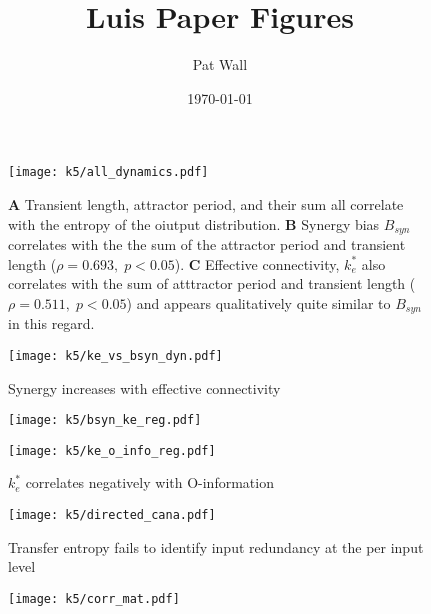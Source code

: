 \documentclass[12 pt]{article}
\title{Luis Paper Figures}
\author{Pat Wall}
\date{\today}
\begin{document}
\maketitle

\begin{figure}
    \texttt{[image: k5/all\_dynamics.pdf]}
    \caption{\textbf{A} Transient length, attractor period, and their sum all 
    correlate with the entropy of the oiutput distribution. \textbf{B} Synergy 
    bias $B_{syn}$ correlates with the the sum of the attractor period and 
    transient length ($\rho=0.693, \; p<0.05$). \textbf{C} Effective
    connectivity, $k_e^*$ also correlates with the sum of atttractor period and
    transient length ($\rho=0.511, \; p<0.05$) and appears qualitatively quite
    similar to $B_{syn}$ in this regard.}
    \label{fig:dynamics}
\end{figure}

\begin{figure}
    \texttt{[image: k5/ke\_vs\_bsyn\_dyn.pdf]}
    \caption{Synergy increases with effective connectivity}
    \label{fig:ke-bsyn}
\end{figure}

\begin{figure}
    \texttt{[image: k5/bsyn\_ke\_reg.pdf]}
\end{figure}

\begin{figure}
    \texttt{[image: k5/ke\_o\_info\_reg.pdf]}
    \caption{$k_e^*$ correlates negatively with O-information}
    \label{fig:ke-oinfo}
\end{figure}

\begin{figure}
    \texttt{[image: k5/directed\_cana.pdf]}
    \caption{Transfer entropy fails to identify input redundancy at the per input level}
    \label{fig:r-te}
\end{figure}

\begin{figure}
    \texttt{[image: k5/corr\_mat.pdf]}
\end{figure}

\begin{figure}
\end{figure}
\end{document}
